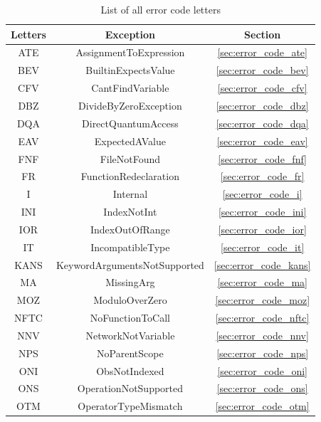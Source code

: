 \newpage

\begin{table}[h!]
    \caption{List of all error code letters}
    \label{tab:list_error_code_letters}
    \centering
    \begin{tabular}{|c|c|c|}
        \hline
        \textbf{Letters} & \textbf{Exception} & \textbf{Section} \\ \hline
        ATE & AssignmentToExpression & \ref{sec:error_code_ate} \\ \hline
        BEV & BuiltinExpectsValue & \ref{sec:error_code_bev} \\ \hline
        CFV & CantFindVariable & \ref{sec:error_code_cfv} \\ \hline
        DBZ & DivideByZeroException & \ref{sec:error_code_dbz} \\ \hline
        DQA & DirectQuantumAccess & \ref{sec:error_code_dqa} \\ \hline
        EAV & ExpectedAValue & \ref{sec:error_code_eav} \\ \hline
        FNF & FileNotFound & \ref{sec:error_code_fnf} \\ \hline
        FR & FunctionRedeclaration & \ref{sec:error_code_fr} \\ \hline
        I & Internal & \ref{sec:error_code_i} \\ \hline
        INI & IndexNotInt & \ref{sec:error_code_ini} \\ \hline
        IOR & IndexOutOfRange & \ref{sec:error_code_ior} \\ \hline
        IT & IncompatibleType & \ref{sec:error_code_it} \\ \hline
        KANS & KeywordArgumentsNotSupported & \ref{sec:error_code_kans} \\ \hline
        MA & MissingArg & \ref{sec:error_code_ma} \\ \hline
        MOZ & ModuloOverZero & \ref{sec:error_code_moz} \\ \hline
        NFTC & NoFunctionToCall & \ref{sec:error_code_nftc} \\ \hline
        NNV & NetworkNotVariable & \ref{sec:error_code_nnv} \\ \hline
        NPS & NoParentScope & \ref{sec:error_code_nps} \\ \hline
        ONI & ObsNotIndexed & \ref{sec:error_code_oni} \\ \hline
        ONS & OperationNotSupported & \ref{sec:error_code_ons} \\ \hline
        OTM & OperatorTypeMismatch & \ref{sec:error_code_otm} \\ \hline

\end{tabular}
\end{table}

